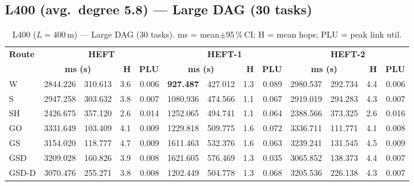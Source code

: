 \documentclass[11pt]{article}
\newcommand{\win}[1]{\textcolor{green!50!black}{\textbf{#1}}}
\newcommand{\bad}[1]{\textcolor{red!70!black}{#1}}
\begin{document}
\subsection{L400 (avg.\ degree 5.8) --- Large DAG (30 tasks)}
\begin{table}[H]\centering\small
\begin{tabular}{l r@{$\pm$}l r r r@{$\pm$}l r r r@{$\pm$}l r r}
\toprule
\textbf{Route} & \multicolumn{4}{c}{\textbf{HEFT}} & \multicolumn{4}{c}{\textbf{HEFT-1}} & \multicolumn{4}{c}{\textbf{HEFT-2}} \\
\cmidrule(lr){2-5}\cmidrule(lr){6-9}\cmidrule(lr){10-13}
& \multicolumn{2}{c}{\textbf{ms (s)}} & \textbf{H} & \textbf{PLU}& \multicolumn{2}{c}{\textbf{ms (s)}} & \textbf{H} & \textbf{PLU}& \multicolumn{2}{c}{\textbf{ms (s)}} & \textbf{H} & \textbf{PLU} \\
\midrule
  W & 2844.226 & 310.613 & 3.6 & 0.006 & \win{927.487} & 427.012 & 1.3 & 0.089 & 2980.537 & 292.734 & 4.4 & 0.006 \\
  S & 2947.258 & 303.632 & 3.8 & 0.007 & 1080.936 & 474.566 & 1.1 & 0.067 & 2919.019 & 294.283 & 4.3 & 0.007 \\
  SH & 2426.675 & 357.120 & 2.6 & 0.014 & 1252.065 & 494.741 & 1.1 & 0.064 & 2388.566 & 373.325 & 2.6 & 0.016 \\
  GO & \bad{3331.649} & 103.409 & 4.1 & 0.009 & 1229.818 & 509.775 & 1.6 & 0.072 & \bad{3336.711} & 111.771 & 4.1 & 0.008 \\
  GS & 3154.020 & 118.777 & 4.7 & 0.009 & 1611.463 & 532.376 & 1.6 & 0.063 & 3239.241 & 131.545 & 4.5 & 0.009 \\
  GSD & 3209.028 & 160.826 & 3.9 & 0.008 & \bad{1621.605} & 576.469 & 1.3 & 0.035 & 3065.852 & 138.373 & 4.4 & 0.007 \\
  GSD-D & 3070.476 & 255.271 & 3.8 & 0.008 & 1202.449 & 504.778 & 1.3 & 0.068 & 3205.536 & 226.138 & 4.3 & 0.007 \\
\bottomrule\end{tabular}
\caption{L400 ($L=400$\,m) --- Large DAG (30 tasks). ms = mean$\pm$95\,\%\,CI; H = mean hops; PLU = peak link util.}
\end{table}
\end{document}
